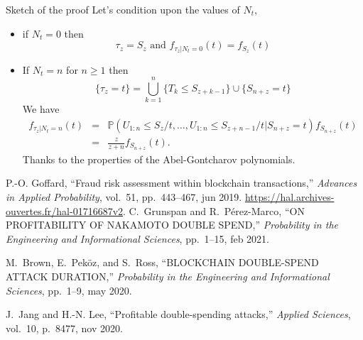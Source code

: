 \documentclass{beamer}
\begin{document}
\begin{frame}{Sketch of the proof}
\scriptsize
Let's condition upon the values of $N_t$,
\begin{itemize}
  \item if $N_t=0$ then 
  $$\tau_z = S_z\text{ and }f_{\tau_z|N_t=0}(t) = f_{S_z}(t)$$
  \item If $N_t = n$ for $n\geq 1$ then 
  $$
  \{\tau_z = t\} = \bigcup_{k = 1}^n\{T_k\leq S_{z+k-1}\}\cup\{S_{n+z} = t\}
  $$
We have 
\begin{eqnarray*}
f_{\tau_z|N_t = n}(t) &=& \mathbb{P}(U_{1:n}\leq S_z/t,\ldots,U_{1:n}\leq S_{z+n-1}/t\Big\rvert S_{n+z}=t)f_{S_{n+z}}(t)\\
&=&\frac{z}{z+n}f_{S_{n+z}}(t).
\end{eqnarray*}
Thanks to the properties of the Abel-Gontcharov polynomials.
\end{itemize}
\tiny
\begin{thebibliography}{1}

P.-O. Goffard, ``Fraud risk assessment within blockchain transactions,'' {\em
  Advances in Applied Probability}, vol.~51, pp.~443--467, jun 2019.
\newblock \url{https://hal.archives-ouvertes.fr/hal-01716687v2}.
C.~Grunspan and R.~P{\'{e}}rez-Marco, ``{ON} {PROFITABILITY} {OF} {NAKAMOTO}
  {DOUBLE} {SPEND},'' {\em Probability in the Engineering and Informational
  Sciences}, pp.~1--15, feb 2021.

M.~Brown, E.~Peköz, and S.~Ross, ``{BLOCKCHAIN} {DOUBLE}-{SPEND} {ATTACK}
  {DURATION},'' {\em Probability in the Engineering and Informational
  Sciences}, pp.~1--9, may 2020.

J.~Jang and H.-N. Lee, ``Profitable double-spending attacks,'' {\em Applied
  Sciences}, vol.~10, p.~8477, nov 2020.

\end{thebibliography}
\end{frame}
\end{document}
